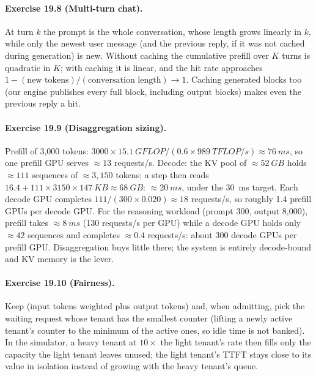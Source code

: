 \paragraph{Exercise 19.8 (Multi-turn chat).}
At turn $k$ the prompt is the whole conversation, whose length grows linearly in $k$, while only the newest
user message (and the previous reply, if it was not cached during generation) is new. Without caching the
cumulative prefill over $K$ turns is quadratic in $K$; with caching it is linear, and the hit rate
approaches $1-(\text{new tokens})/(\text{conversation length})\to1$. Caching generated blocks too (our
engine publishes every full block, including output blocks) makes even the previous reply a hit.

\paragraph{Exercise 19.9 (Disaggregation sizing).}
Prefill of 3,000 tokens: $3000\times\SI{15.1}{GFLOP}/(0.6\times\SI{989}{TFLOP/s})\approx\SI{76}{ms}$, so one prefill GPU
serves $\approx13$ requests/s. Decode: the KV pool of $\approx\SI{52}{GB}$ holds $\approx111$ sequences of
$\approx3{,}150$ tokens; a step then reads $16.4+111\times3150\times\SI{147}{KB}\approx\SI{68}{GB}$:
$\approx\SI{20}{ms}$, under the \SI{30}{ms} target. Each decode GPU completes $111/(300\times0.020)\approx18$
requests/s, so roughly 1.4 prefill GPUs per decode GPU. For the reasoning workload (prompt 300, output
8,000), prefill takes $\approx\SI{8}{ms}$ (130 requests/s per GPU) while a decode GPU holds only $\approx42$
sequences and completes $\approx0.4$ requests/s: about 300 decode GPUs per prefill GPU. Disaggregation buys
little there; the system is entirely decode-bound and KV memory is the lever.

\paragraph{Exercise 19.10 (Fairness).}
Keep  (input tokens weighted plus output tokens) and, when admitting, pick the waiting
request whose tenant has the smallest counter (lifting a newly active tenant's counter to the minimum of the
active ones, so idle time is not banked). In the simulator, a heavy tenant at $10\times$ the light tenant's rate
then fills only the capacity the light tenant leaves unused; the light tenant's TTFT stays close to its
value in isolation instead of growing with the heavy tenant's queue.
